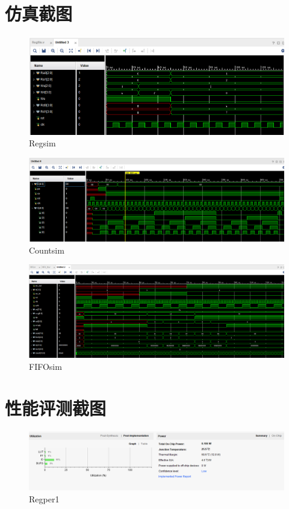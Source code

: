 \documentclass[12pt, a4paper]{article}
\begin{document}
\section{仿真截图}
\begin{figure}[H]
	\centering
	\includegraphics[width=0.9\linewidth]{Regsim}
	\caption{Regsim}
	\label{fig:Regsim}
\end{figure}

\begin{figure}[H]
	\centering
	\includegraphics[width=0.9\linewidth]{Countsim}
	\caption{Countsim}
	\label{fig:Countsim}
\end{figure}

\begin{figure}[H]
\centering
\includegraphics[width=0.9\linewidth]{FIFOsim}
\caption{FIFOsim}
\label{fig:FIFOsim}
\end{figure}
\clearpage
\section{性能评测截图}
\begin{figure}[H]
	\centering
	\includegraphics[width=0.9\linewidth]{Regper1}
	\caption{Regper1}
	\label{fig:Regper1}
\end{figure}
\end{document}
